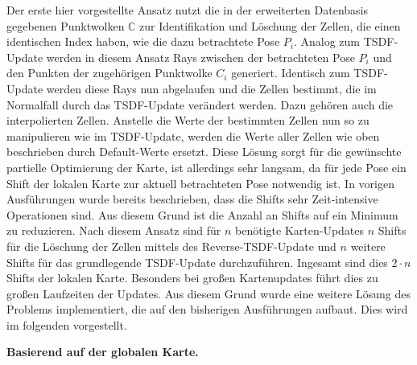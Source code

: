 Der erste hier vorgestellte Ansatz nutzt die in der erweiterten Datenbasis gegebenen Punktwolken $\mathbb{C}$ zur Identifikation und Löschung der Zellen, die einen identischen Index haben, wie die dazu betrachtete Pose $P_i$. Analog zum TSDF-Update werden in diesem Ansatz Rays zwischen der betrachteten Pose $P_i$ und den Punkten der zugehörigen Punktwolke $C_i$ generiert. Identisch zum TSDF-Update werden diese Rays nun abgelaufen und die Zellen bestimmt, die im Normalfall durch das TSDF-Update verändert werden. Dazu gehören auch die interpolierten Zellen. Anstelle die Werte der bestimmten Zellen nun so zu manipulieren wie im TSDF-Update, werden die Werte aller Zellen wie oben beschrieben durch Default-Werte ersetzt. Diese Lösung sorgt für die gewünschte partielle Optimierung der Karte, ist allerdings sehr langsam, da für jede Pose ein Shift der lokalen Karte zur aktuell betrachteten Pose notwendig ist. In vorigen Ausführungen wurde bereits beschrieben, dass die Shifts sehr Zeit-intensive Operationen sind. Aus diesem Grund ist die Anzahl an Shifts auf ein Minimum zu reduzieren. Nach diesem Ansatz sind für $n$ benötigte Karten-Updates $n$ Shifts für die Löschung der Zellen mittels des Reverse-TSDF-Update und $n$ weitere Shifts für das grundlegende TSDF-Update durchzuführen. Ingesamt sind dies $2 \cdot n$ Shifts der lokalen Karte. Besonders bei großen Kartenupdates führt dies zu großen Laufzeiten der Updates. Aus diesem Grund wurde eine weitere Lösung des Problems implementiert, die auf den bisherigen Ausführungen aufbaut. Dies wird im folgenden vorgestellt.


\textbf{Basierend auf der globalen Karte.}

